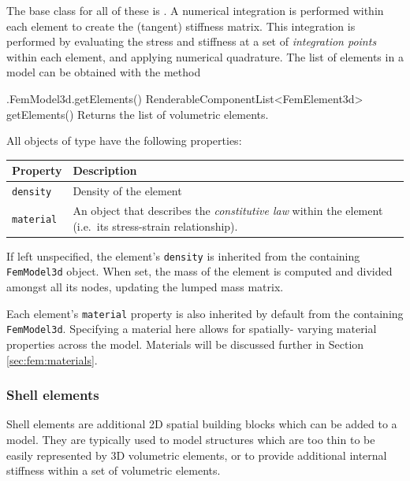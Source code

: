 The base class for all of these is .  A numerical integration is performed within each element
to create the (tangent) stiffness matrix.  This integration is performed
by evaluating the stress and stiffness at a set of \emph{integration points}
within each element, and applying numerical quadrature.  The list of elements
in a model can be obtained with the method
%
\begin{methodtable}{0.6}{0.4}
\midline
%
\methodentry
{\fem.FemModel3d.getElements()}%
{RenderableComponentList<FemElement3d> getElements()}%
{Returns the list of volumetric elements.}%
%
\midline
\end{methodtable}
%
All objects of type  have the 
following properties:
\begin{center}
\begin{tabular}{|ll|}
  \hline
  Property & Description\\
  \hline
  {\tt density} & Density of the element\\
  {\tt material} & An object that describes the \emph{constitutive law} 
                   within the element (i.e.~its stress-strain 
                   relationship).\\
  \hline
\end{tabular}
\end{center}

If left unspecified, the element's {\tt density} is inherited from the 
containing {\tt FemModel3d} object.  When set, the mass of the element is
computed and divided amongst all its nodes, updating the lumped mass
matrix.

Each element's {\tt material} property is also inherited by default from the 
containing {\tt FemModel3d}. Specifying a material here allows for spatially-%
varying material properties across the model.  Materials will be discussed
further in Section \ref{sec:fem:materials}.

\subsubsection{Shell elements}

Shell elements are additional 2D spatial building blocks which can be
added to a model. They are typically used to model structures which
are too thin to be easily represented by 3D volumetric elements, or to
provide additional internal stiffness within a set of volumetric
elements.

